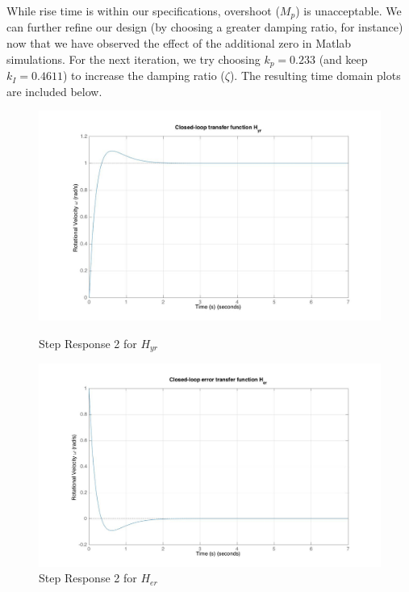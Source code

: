 \documentclass[11pt,titlepage]{article}
\begin{document}
	\noindent While rise time is within our specifications, overshoot ($M_p$) is unacceptable. We can further refine our design (by choosing a greater damping ratio, for instance) now that we have observed the effect of the additional zero in Matlab simulations. For the next iteration, we try choosing $k_p=0.233$ (and keep $k_I=0.4611$) to increase the damping ratio ($\zeta$). The resulting time domain plots are included below.
	
     \begin{figure}[H]
        \centering
        \begin{minipage}{.5\textwidth}
            \centering
            \includegraphics[scale=.18]{Hyr_step2_mat}
            \caption{Step Response 2 for $H_{yr}$}
            \label{fig:Hyr_step2_mat}
        \end{minipage}%
        \begin{minipage}{.5\textwidth}
            \centering
            \includegraphics[scale=.18]{Her_step2_mat}
            \caption{Step Response 2 for $H_{er}$}
            \label{fig:Her_step2_mat}
        \end{minipage}%
    \end{figure}
\end{document}
